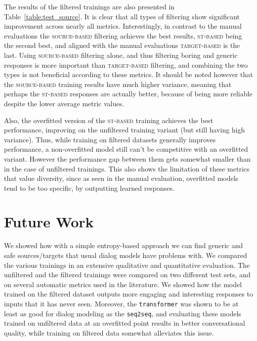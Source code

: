 \documentclass[11pt,a4paper]{article}
\begin{document}
The results of the filtered trainings are also presented in Table~\ref{table:test_source}. It is clear that all types of filtering show significant improvement across nearly all metrics. Interestingly, in contrast to the manual evaluations the \textsc{source-based} filtering achieves the best results, \textsc{st-based} being the second best, and aligned with the manual evaluations \textsc{target-based} is the last. Using \textsc{source-based} filtering alone, and thus filtering boring and generic responses is more important than \textsc{target-based} filtering, and combining the two types is not beneficial according to these metrics. It should be noted however that the \textsc{source-based} training results have much higher variance, meaning that perhaps the \textsc{st-based} responses are actually better, because of being more reliable despite the lower average metric values.

Also, the overfitted version of the \textsc{st-based} training achieves the best performance, improving on the unfiltered training variant (but still having high variance). Thus, while training on filtered datasets generally improves performance, a non-overfitted model still can't be competitive with an overfitted variant. However the performance gap between them gets somewhat smaller than in the case of unfiltered trainings. This also shows the limitation of these metrics that value diversity, since as seen in the manual evaluation, overfitted models tend to be too specific, by outputting learned responses.


\section{Future Work}
\label{sec:conclusion}
We showed how with a simple entropy-based approach we can find generic and
safe sources/targets that usual dialog models have problems with. We
compared the various trainings in an extensive qualitative and quantitative
evaluation. The unfiltered and the
filtered trainings were compared on two different test sets, and on several automatic metrics used in the literature. We showed
how the model trained on the filtered dataset outputs more engaging and
interesting responses to inputs that it has never seen. Moreover, the \texttt{transformer} was shown to be at least as good for dialog modeling as the \texttt{seq2seq}, and evaluating these models trained on unfiltered data at an overfitted point results in better conversational quality, while training on filtered data somewhat alleviates this issue.
\end{document}
